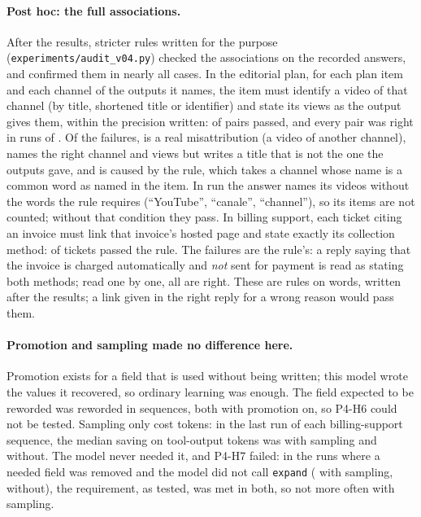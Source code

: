 \paragraph{Post hoc: the full associations.} After the results, stricter rules written for the purpose
(\texttt{experiments/audit\_v04.py}) checked the associations on the recorded answers, and confirmed them in
nearly all cases. In the editorial plan, for
each plan item and each channel of the outputs it names, the item must identify a video of that channel (by title,
shortened title or identifier) and state its views as the output gives them, within the precision written:
\AuditETwoCorrecti{} of \AuditETwoPairsi{} pairs passed, and every pair was right in \AuditETwoRunsAlli{} runs of
\AuditETwoRunsi. Of the \AuditETwoFailedi{} failures, \AuditETwoMisattributedi{} is a real misattribution (a video of
another channel), \AuditETwoTitlei{} names the right channel and views but writes a title that is not the one the
outputs gave, and \AuditETwoRulei{} is caused by the rule, which takes a channel whose name is a common word as named
in the item. In \AuditETwoUncheckedi{} run the answer names its videos without the words the rule requires (``YouTube'',
``canale'', ``channel''), so its \AuditETwoUncheckedItemsi{} items are not counted; without that condition they pass.
In billing support, each ticket citing an invoice must link that invoice's hosted page and state exactly its
collection method: \AuditETwoCorrectiv{} of \AuditETwoTicketsiv{} tickets passed the rule. The \AuditETwoAmbiguousiv{}
failures are the rule's: a reply saying that the invoice is charged automatically and \emph{not} sent for payment
is read as stating both methods; read one by one, all \AuditETwoByHandiv{} are right. These are rules on words, written
after the results; a link given in the right reply for a wrong reason would pass them.

\paragraph{Promotion and sampling made no difference here.} Promotion exists for a field that is used without
being written; this model wrote the values it recovered, so ordinary learning was enough. The field expected to be
reworded was reworded in \SthreeHSixReworded{} sequences, both with promotion on, so P4-H6 could not be tested.
Sampling only cost tokens: in the last run of each billing-support sequence, the median saving on tool-output tokens
was \SthreeETwoSavingSampling{} with sampling and \SthreeETwoSavingNoSampling{} without. The model never needed it,
and P4-H7 failed: in the runs where a needed field was removed and the model did not call \texttt{expand}
(\SthreeHSevenPerGroup{} with sampling, \SthreeHSevenPerGroup{} without), the requirement, as tested, was met in
both, so not more often with sampling.

